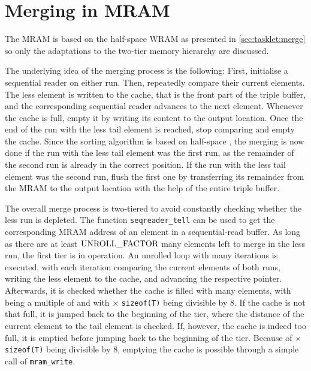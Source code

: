 \section{Merging in MRAM}
\label{sec:mram:merge}

The MRAM \MS{} is based on the half-space WRAM \MS{} as presented in \cref{sec:tasklet:merge} so only the adaptations to the two-tier memory hierarchy are discussed.

The underlying idea of the merging process is the following:
First, initialise a sequential reader on either run.
Then, repeatedly compare their current elements.
The less element is written to the cache, that is the front part of the triple buffer, and the corresponding sequential reader advances to the next element.
Whenever the cache is full, empty it by writing its content to the output location.
Once the end of the run with the less tail element is reached, stop comparing and empty the cache.
Since the sorting algorithm is based on half-space \MS{}, the merging is now done if the run with the less tail element was the first run, as the remainder of the second run is already in the correct position.
If the run with the less tail element was the second run, flush the first one by transferring its remainder from the MRAM to the output location with the help of the entire triple buffer.

The overall merge process is two-tiered to avoid constantly checking whether the less run is depleted.
The function \lstinline|seqreader_tell| can be used to get the corresponding MRAM address of an element in a sequential-read buffer.
As long as there are at least \(\unrollfactor{}\) many elements left to merge in the less run, the first tier is in operation.
An unrolled loop with \unrollfactor{} many iterations is executed, with each iteration comparing the current elements of both runs, writing the less element to the cache, and advancing the respective pointer.
Afterwards, it is checked whether the cache is filled with \unrolledcachelength{} many elements, with \unrolledcachelength{} being a multiple of \unrollfactor{} and with \unrolledcachelength × \lstinline[keywords={}]|sizeof(T)| being divisible by 8.
If the cache is not that full, it is jumped back to the beginning of the tier, where the distance of the current element to the tail element is checked.
If, however, the cache is indeed too full, it is emptied before jumping back to the beginning of the tier.
Because of \unrolledcachelength × \lstinline[keywords={}]|sizeof(T)| being divisible by 8, emptying the cache is possible through a simple call of \lstinline|mram_write|.


